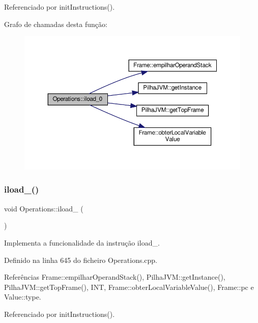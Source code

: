 Referenciado por init\+Instructions().

Grafo de chamadas desta função\+:\nopagebreak
\begin{figure}[H]
\begin{center}
\leavevmode
\includegraphics[width=350pt]{classOperations_a3aba059cf78681767c141d27989fc2aa_cgraph}
\end{center}
\end{figure}
\mbox{\label{classOperations_a4b9d8ef21894c0db2203c06712e97765}} 
\subsubsection{\texorpdfstring{iload\+\_()}{iload\_1()}}
{\footnotesize\ttfamily void Operations\+::iload\+\_ (\begin{DoxyParamCaption}{ }\end{DoxyParamCaption})\hspace{0.3cm}{\ttfamily [private]}}



Implementa a funcionalidade da instrução iload\+\_. 



Definido na linha 645 do ficheiro Operations.\+cpp.



Referências Frame\+::empilhar\+Operand\+Stack(), Pilha\+J\+V\+M\+::get\+Instance(), Pilha\+J\+V\+M\+::get\+Top\+Frame(), I\+NT, Frame\+::obter\+Local\+Variable\+Value(), Frame\+::pc e Value\+::type.



Referenciado por init\+Instructions().

